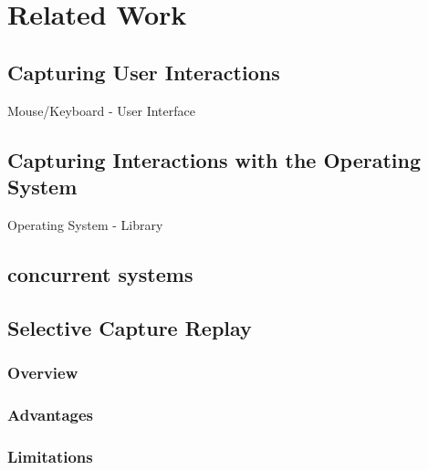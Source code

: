 \chapter{Related Work}

\section {Capturing User Interactions}
Mouse/Keyboard - User Interface
\section {Capturing Interactions with the Operating System}
Operating System - Library
\section {concurrent systems}
\section{Selective Capture Replay}
\subsection{Overview}
\subsection{Advantages}
\subsection{Limitations}
